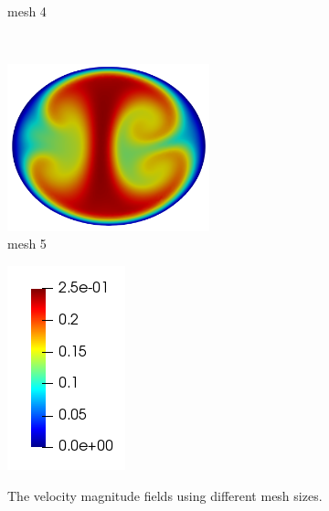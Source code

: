 \begin{figure}[htbp]
\begin{minipage}[c][2in][c]{0.4\linewidth}
        mesh 4
    \end{minipage}\\[.5\baselineskip]
    \begin{minipage}[c][2in][c]{0.4\linewidth}
        \centering
        \includegraphics[width=2.3in]{imgs/vena_cava/Umag_mesh5.png}\\
        mesh 5
    \end{minipage}
    \begin{minipage}[c][2in][c]{0.4\linewidth}
        \centering
        \includegraphics[width=.7in]{imgs/vena_cava/colormap_exercise.png}\\
    \end{minipage}
    \caption{The velocity magnitude fields using different mesh sizes.}
    \label{fig:velmag}
\end{figure}


